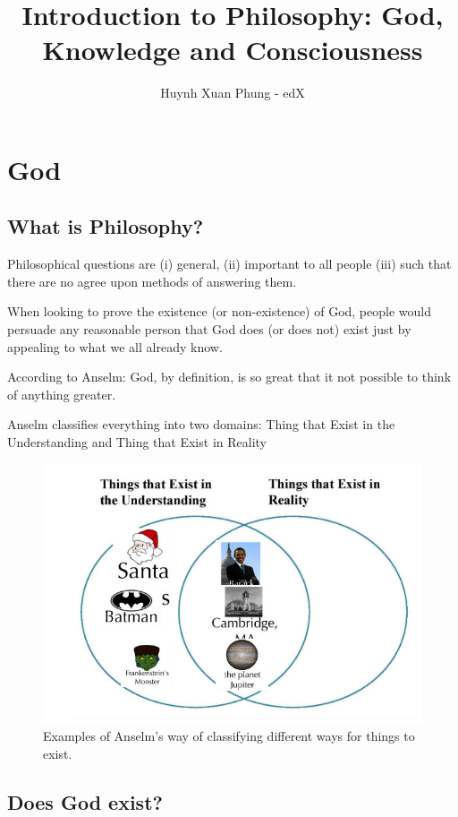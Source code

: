\documentclass{article}
\title{Introduction to Philosophy: God, Knowledge and Consciousness}
\author{Huynh Xuan Phung - edX}
\date{ }
\begin{document}
 
\maketitle
 
\tableofcontents
\section{God}


\subsection{What is Philosophy?}
Philosophical questions are (i) general, (ii) important to all people (iii) such that there are no agree upon methods of answering them.

When looking to prove the existence (or non-existence) of God, people would persuade any reasonable person that God does (or does not) exist just by appealing to what we all already know.

According to Anselm: God, by definition, is so great that it not possible to think of anything greater.

Anselm classifies everything into two domains: Thing that Exist in the Understanding and Thing that Exist in Reality

\begin{figure}
\includegraphics[scale=0.6]{figures/Understanding_Reality.png}
\caption{Examples of Anselm's way of classifying different ways for things to exist.}
\end{figure}


\subsection{Does God exist?}
\end{document}
